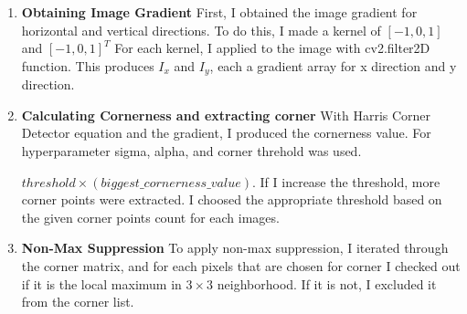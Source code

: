 \begin{enumerate}
    \item \textbf{Obtaining Image Gradient} First, I obtained the image gradient for horizontal and vertical directions. To do this, I made a kernel of $\left[-1,0,1\right]$ and ${\left[ -1,0,1 \right]}^T$ 
    For each kernel, I applied to the image with cv2.filter2D function. This produces $I_{x}$ and $I_{y}$, each a gradient array for x direction and y direction.
    
    \item \textbf{Calculating Cornerness and extracting corner} With Harris Corner Detector equation and the gradient, I produced the cornerness value. For hyperparameter sigma, alpha, and corner threhold was used.
    
    $threshold\times(biggest\_cornerness\_value)$. If I increase the threshold, more corner points were extracted. I choosed the appropriate threshold based on the given corner points count for each images.
    \item \textbf{Non-Max Suppression} To apply non-max suppression, I iterated through the corner matrix, and for each pixels that are chosen for corner I checked out if it is the local maximum in $3\times3$ neighborhood.  If it is not, I excluded it from the corner list.
    
    
\end{enumerate}


